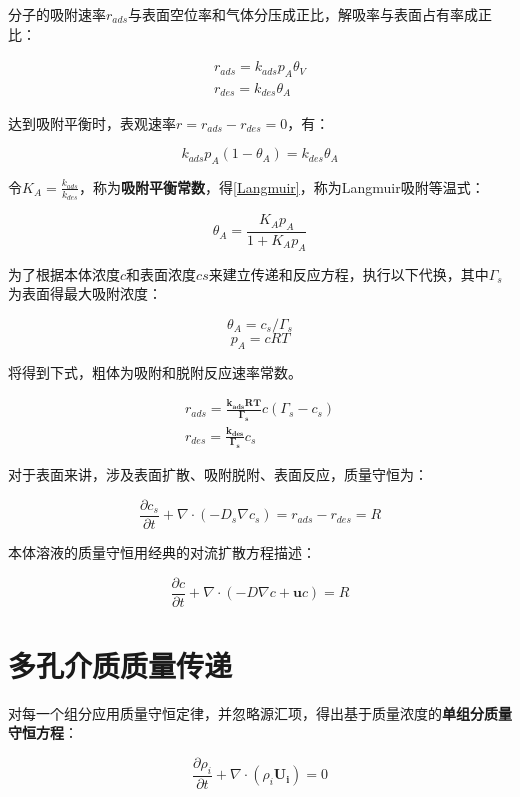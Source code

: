分子的吸附速率$ r_{ads} $与表面空位率和气体分压成正比，解吸率与表面占有率成正比：

\begin{gather}
    r_{ads} = k_{ads}p_A\theta_V \\
    r_{des} = k_{des}\theta_A
\end{gather}

达到吸附平衡时，表观速率$ r=r_{ads}-r_{des}=0 $，有：

\[k_{ads}p_A(1-\theta_A)=k_{des}\theta_A\]

令$ K_A=\frac{k_{ads}}{k_{des}} $，称为\textbf{吸附平衡常数}，得\autoref{Langmuir}，称为Langmuir吸附等温式：

\begin{equation}\label{Langmuir}
    \theta_A = \frac{K_Ap_A}{1+K_Ap_A}
\end{equation}

为了根据本体浓度$ c $和表面浓度$ cs $来建立传递和反应方程，执行以下代换，其中$ \Gamma_s $为表面得最大吸附浓度：

\[\theta_A = c_s/\Gamma_s\]
\[p_A=cRT\]

将得到下式，粗体为吸附和脱附反应速率常数。

\begin{gather}
    r_{ads} = \bm{\frac{k_{ads}RT}{\Gamma_s}}c(\Gamma_s-c_s)\\
    r_{des} = \bm{\frac{k_{des}}{\Gamma_s}}c_s
\end{gather}

对于表面来讲，涉及表面扩散、吸附脱附、表面反应，质量守恒为：

\begin{equation}
    \frac{\partial c_s}{\partial t}+\nabla\cdot(-D_s\nabla c_s) = r_{ads}-r_{des}=R
\end{equation}

本体溶液的质量守恒用经典的对流扩散方程描述：

\begin{equation}
    \frac{\partial c}{\partial t} + \nabla\cdot(-D\nabla c+\bm{u}c) = R
\end{equation}

\section{多孔介质质量传递}

对每一个组分应用质量守恒定律，并忽略源汇项，得出基于质量浓度的\textbf{单组分质量守恒方程}：

\begin{equation}
\frac{\partial \rho_i}{\partial t} + \nabla\cdot(\rho_i\bm{U_i}) = 0
\end{equation}

